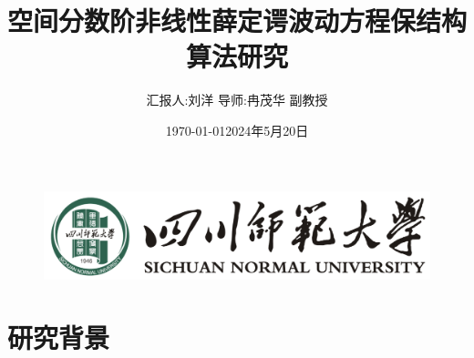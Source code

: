 \documentclass[aspectratio=169]{beamer}
\title[空间分数阶非线性薛定谔波动方程保结构算法研究
]{空间分数阶非线性薛定谔波动方程保结构算法研究}
\author[刘洋]{\footnotesize 汇报人:刘洋 \quad 导师:冉茂华 副教授}
\institute[四川师范大学偏微分方程与物理团队]{\footnotesize 四川师范大学偏微分方程与物理团队}
\date{\footnotesize \vskip -10pt \today}
\date{2024年5月20日}
\numberwithin{theorem}{section} %
\begin{document}
\kaishu
\begin{frame}
	\titlepage
	\vspace{-2mm}
	\begin{figure}[htpb]
		\begin{center}
			\includegraphics[width=0.45\linewidth]{pic/SICNU_Logo2.png}
		\end{center}
	\end{figure}
\end{frame}
\begin{frame}
\tableofcontents[sectionstyle=show,subsectionstyle=show/shaded/hide,subsubsectionstyle=show/shaded/hide]
\end{frame}

\section{研究背景}

\end{document}
